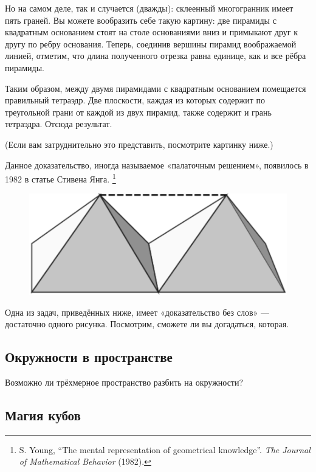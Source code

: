 Но на самом деле, так и случается (дважды):
склеенный многогранник имеет пять граней.
Вы можете вообразить себе такую картину: две пирамиды с квадратным основанием стоят на столе основаниями вниз и примыкают друг к другу по ребру основания.
Теперь, соединив вершины пирамид воображаемой линией, отметим, что длина полученного отрезка равна единице, как и все рёбра пирамиды.

Таким образом, между двумя пирамидами с квадратным основанием помещается правильный тетраэдр.
Две плоскости, каждая из которых содержит по треугольной грани от каждой из двух пирамид, также содержит и грань тетраэдра.
Отсюда результат.
\heart

(Если вам затруднительно это представить, посмотрите картинку ниже.)

Данное доказательство, иногда называемое «палаточным решением», появилось в 1982 в статье Стивена Янга.%
\footnote{S. Young, ``The mental representation of geometrical knowledge''. \emph{The Journal of Mathematical Behavior} (1982).}

\begin{figure}[h!]
\centering
\includegraphics[scale=0.55]{Figs/Geometry/pyrs}
\end{figure} 

Одна из задач, приведённых ниже, имеет «доказательство без слов» --- достаточно одного рисунка.
Посмотрим, сможете ли вы догадаться, которая.

\subsection*{Окружности в пространстве}%

Возможно ли трёхмерное пространство разбить на окружности? 

\subsection*{Магия кубов}%

